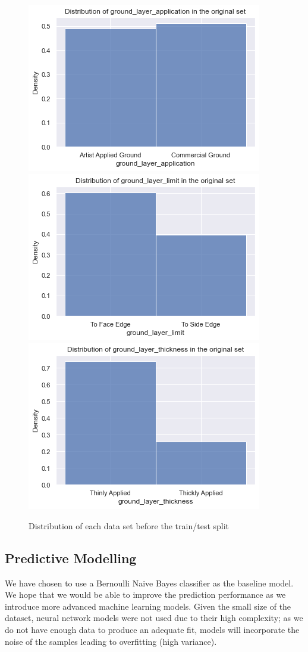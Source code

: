 \documentclass[11pt, oneside]{article}
\begin{document}
\begin{figure}[H]
\centering
\includegraphics[width=.5\textwidth]{images/distribApp.png}\hfill
\includegraphics[width=.5\textwidth]{images/distribLim.png} 
\\[\smallskipamount]
\includegraphics[width=.5\textwidth]{images/distribThic.png}\hfill
\caption{Distribution of each data set before the train/test split}
\label{distribTrTe}
\end{figure}

\subsection{Predictive Modelling}
We have chosen to use a Bernoulli Naive Bayes classifier as the baseline model. We hope that we would be able to improve the prediction performance as we introduce more advanced machine learning models. Given the small size of the dataset, neural network models were not used due to their high complexity; as we do not have enough data to produce an adequate fit, models will incorporate the noise of the samples leading to overfitting (high variance).
\end{document}
